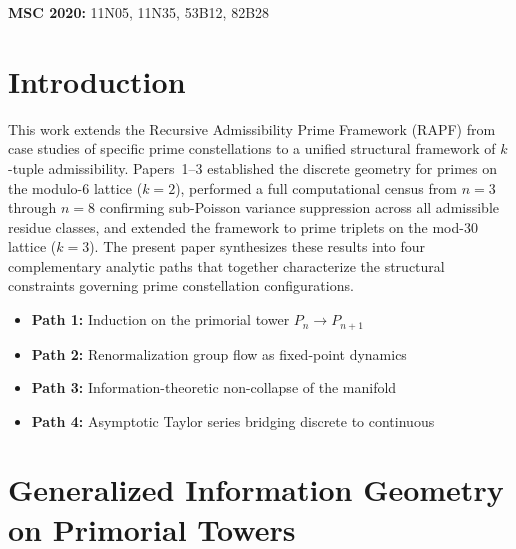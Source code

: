 \documentclass[11pt]{article}
\theoremstyle{remark}
\begin{document}
\noindent \textbf{MSC 2020:} 11N05, 11N35, 53B12, 82B28

\section{Introduction}

This work extends the Recursive Admissibility Prime Framework (RAPF) from
case studies of specific prime constellations to a unified structural framework
of $k$-tuple admissibility. Papers~1--3 established the discrete geometry
for primes on the modulo-6 lattice ($k=2$), performed a full computational
census from $n=3$ through $n=8$ confirming sub-Poisson variance suppression
across all admissible residue classes, and extended the framework to prime
triplets on the mod-30 lattice ($k=3$). The present paper synthesizes
these results into four complementary analytic paths that together characterize
the structural constraints governing prime constellation configurations.

\begin{itemize}
    \item \textbf{Path 1:} Induction on the primorial tower $P_n \to P_{n+1}$
    \item \textbf{Path 2:} Renormalization group flow as fixed-point dynamics
    \item \textbf{Path 3:} Information-theoretic non-collapse of the manifold
    \item \textbf{Path 4:} Asymptotic Taylor series bridging discrete to continuous
\end{itemize}

\section{Generalized Information Geometry on Primorial Towers}
\end{document}
